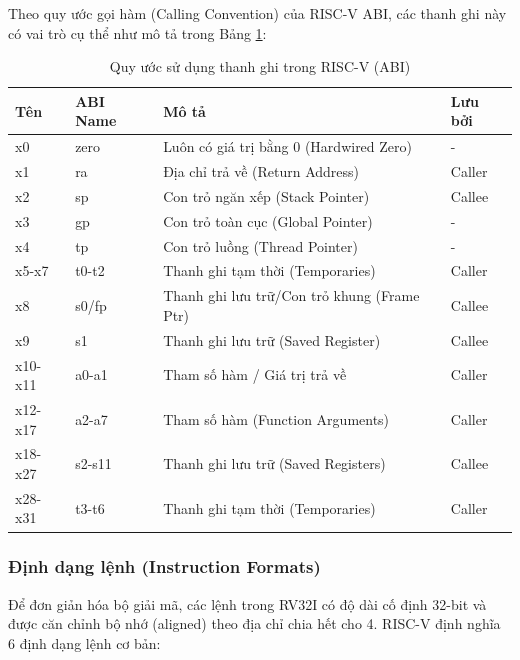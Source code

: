 Theo quy ước gọi hàm (Calling Convention) của RISC-V ABI, các thanh ghi này có vai trò cụ thể như mô tả trong Bảng \ref{tab:riscv_registers}:

\begin{table}[h]
\centering
\begin{tabular}{|l|l|l|l|}
\hline
\textbf{Tên} & \textbf{ABI Name} & \textbf{Mô tả} & \textbf{Lưu bởi} \\ \hline
x0 & zero & Luôn có giá trị bằng 0 (Hardwired Zero) & - \\ \hline
x1 & ra & Địa chỉ trả về (Return Address) & Caller \\ \hline
x2 & sp & Con trỏ ngăn xếp (Stack Pointer) & Callee \\ \hline
x3 & gp & Con trỏ toàn cục (Global Pointer) & - \\ \hline
x4 & tp & Con trỏ luồng (Thread Pointer) & - \\ \hline
x5-x7 & t0-t2 & Thanh ghi tạm thời (Temporaries) & Caller \\ \hline
x8 & s0/fp & Thanh ghi lưu trữ/Con trỏ khung (Frame Ptr) & Callee \\ \hline
x9 & s1 & Thanh ghi lưu trữ (Saved Register) & Callee \\ \hline
x10-x11 & a0-a1 & Tham số hàm / Giá trị trả về & Caller \\ \hline
x12-x17 & a2-a7 & Tham số hàm (Function Arguments) & Caller \\ \hline
x18-x27 & s2-s11 & Thanh ghi lưu trữ (Saved Registers) & Callee \\ \hline
x28-x31 & t3-t6 & Thanh ghi tạm thời (Temporaries) & Caller \\ \hline
\end{tabular}
\caption{Quy ước sử dụng thanh ghi trong RISC-V (ABI)}
\label{tab:riscv_registers}
\end{table}

\subsubsection{Định dạng lệnh (Instruction Formats)}
Để đơn giản hóa bộ giải mã, các lệnh trong RV32I có độ dài cố định 32-bit và được căn chỉnh bộ nhớ (aligned) theo địa chỉ chia hết cho 4. RISC-V định nghĩa 6 định dạng lệnh cơ bản:

